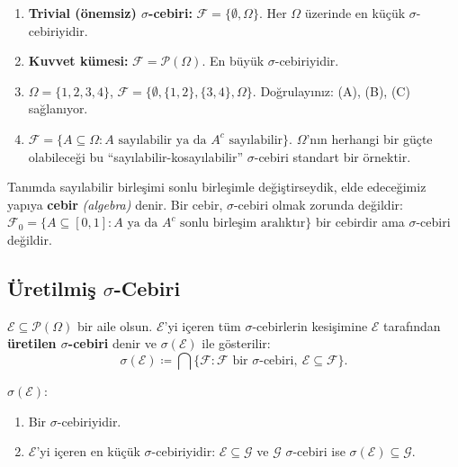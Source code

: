 \begin{ornek}\label{ex:sigmaoernekler}
\begin{enumerate}[label=(\alph*)]
  \item \textbf{Trivial (önemsiz) $\sigma$-cebiri:} $\mathcal{F} = \{\emptyset, \Omega\}$.
        Her $\Omega$ üzerinde en küçük $\sigma$-cebiriyidir.
  \item \textbf{Kuvvet kümesi:} $\mathcal{F} = \mathcal{P}(\Omega)$.
        En büyük $\sigma$-cebiriyidir.
  \item $\Omega = \{1,2,3,4\}$, $\mathcal{F} = \{\emptyset, \{1,2\}, \{3,4\}, \Omega\}$.
        Doğrulayınız: (A), (B), (C) sağlanıyor.
  \item $\mathcal{F} = \{A \subseteq \Omega : A \text{ sayılabilir ya da } A^c \text{ sayılabilir}\}$.
        $\Omega$'nın herhangi bir güçte olabileceği bu ``sayılabilir-kosayılabilir''
        $\sigma$-cebiri standart bir örnektir.
\end{enumerate}
\end{ornek}

\begin{kritiksorgu}
Tanımda sayılabilir birleşimi sonlu birleşimle değiştirseydik, elde edeceğimiz
yapıya \textbf{cebir} \emph{(algebra)} denir. Bir cebir, $\sigma$-cebiri olmak
zorunda değildir: $\mathcal{F}_0 = \{A \subseteq [0,1] : A \text{ ya da } A^c
\text{ sonlu birleşim aralıktır}\}$ bir cebirdir ama $\sigma$-cebiri değildir.
\end{kritiksorgu}

\subsection{Üretilmiş $\sigma$-Cebiri}

\begin{tanim}\label{def:sigmauretilensi}
$\mathcal{E} \subseteq \mathcal{P}(\Omega)$ bir aile olsun.
$\mathcal{E}$'yi içeren tüm $\sigma$-cebirlerin kesişimine
$\mathcal{E}$ tarafından \textbf{üretilen $\sigma$-cebiri} denir ve
$\sigma(\mathcal{E})$ ile gösterilir:
\[
  \sigma(\mathcal{E}) \coloneqq \bigcap \{\mathcal{F} : \mathcal{F} \text{ bir } \sigma\text{-cebiri}, \ \mathcal{E} \subseteq \mathcal{F}\}.
\]
\end{tanim}

\begin{onerme}\label{prop:sigmaiyitanim}
$\sigma(\mathcal{E})$:
\begin{enumerate}[label=(\roman*)]
  \item Bir $\sigma$-cebiriyidir.
  \item $\mathcal{E}$'yi içeren en küçük $\sigma$-cebiriyidir:
        $\mathcal{E} \subseteq \mathcal{G}$ ve $\mathcal{G}$ $\sigma$-cebiri ise
        $\sigma(\mathcal{E}) \subseteq \mathcal{G}$.
\end{enumerate}
\end{onerme}

